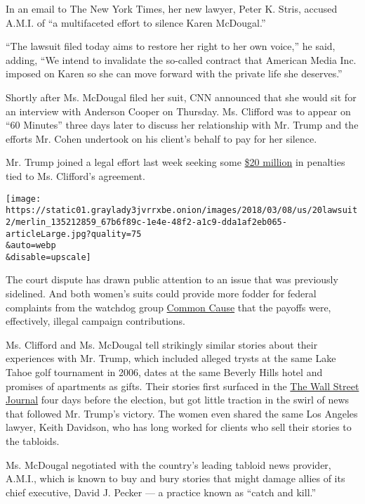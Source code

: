 In an email to The New York Times, her new lawyer, Peter K. Stris,
accused A.M.I. of ``a multifaceted effort to silence Karen McDougal.''

``The lawsuit filed today aims to restore her right to her own voice,''
he said, adding, ``We intend to invalidate the so-called contract that
American Media Inc. imposed on Karen so she can move forward with the
private life she deserves.''

Shortly after Ms. McDougal filed her suit, CNN announced that she would
sit for an interview with Anderson Cooper on Thursday. Ms. Clifford was
to appear on ``60 Minutes'' three days later to discuss her relationship
with Mr. Trump and the efforts Mr. Cohen undertook on his client's
behalf to pay for her silence.

Mr. Trump joined a legal effort last week seeking some
\href{https://www.nytimes3xbfgragh.onion/2018/03/16/us/trumps-stormy-daniels-lawsuit.html}{\$20
million} in penalties tied to Ms. Clifford's agreement.

\texttt{[image: https://static01.graylady3jvrrxbe.onion/images/2018/03/08/us/20lawsuit2/merlin\_135212859\_67b6f89c-1e4e-48f2-a1c9-dda1af2eb065-articleLarge.jpg?quality=75\\\&auto=webp\\\&disable=upscale]}

The court dispute has drawn public attention to an issue that was
previously sidelined. And both women's suits could provide more fodder
for federal complaints from the watchdog group
\href{http://www.commoncause.org/press/press-releases/trump-attorney-appears-to-have-made-illegal-contributions-to-trump-camoaign-when-he-made-alleged-hush-money-payment-to-stormy-daniels.html}{Common
Cause} that the payoffs were, effectively, illegal campaign
contributions.

Ms. Clifford and Ms. McDougal tell strikingly similar stories about
their experiences with Mr. Trump, which included alleged trysts at the
same Lake Tahoe golf tournament in 2006, dates at the same Beverly Hills
hotel and promises of apartments as gifts. Their stories first surfaced
in the
\href{https://www.wsj.com/articles/national-enquirer-shielded-donald-trump-from-playboy-models-affair-allegation-1478309380}{The
Wall Street Journal} four days before the election, but got little
traction in the swirl of news that followed Mr. Trump's victory. The
women even shared the same Los Angeles lawyer, Keith Davidson, who has
long worked for clients who sell their stories to the tabloids.

Ms. McDougal negotiated with the country's leading tabloid news
provider, A.M.I., which is known to buy and bury stories that might
damage allies of its chief executive, David J. Pecker --- a practice
known as ``catch and kill.''

